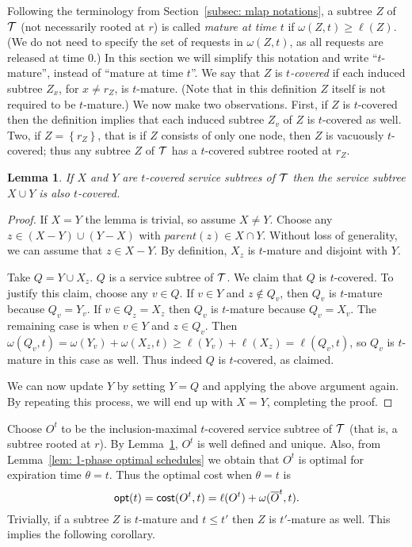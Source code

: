 \documentclass[a4paper]{article}
\newtheorem{lemma}[theorem]{Lemma}
\newcommand{\barO}{\overline{O}}
\newcommand{\calT}{{\cal T}}
\newcommand{\braced}[1]{{ \left\{ #1 \right\} }}
\newcommand{\cost}{\mbox{\rm\textsf{cost}}}
\newcommand{\opt}{\mbox{\rm\textsf{opt}}}
\newcommand{\length}{\ell}
\newcommand{\parent}{\textit{parent}}
\newcommand{\expiration}{\theta}
\begin{document}
Following the terminology from Section~\ref{subsec: mlap notations}, 
a subtree $Z$ of $\calT$ (not necessarily rooted at $r$)
is called \emph{mature at time $t$} if $\omega(Z,t)\ge \length(Z)$. (We do not need to specify
the set of requests in $\omega(Z,t)$, as all requests are released at time $0$.)
In this section we will simplify this notation and write ``$t$-mature'', instead of
``mature at time $t$''.
We say that $Z$ is \emph{$t$-covered} if each induced subtree 
$Z_x$, for $x\neq r_Z$, is $t$-mature. (Note that in this definition
$Z$ itself is not required to be $t$-mature.)
We now make two observations. First, if $Z$ is $t$-covered then
the definition implies that each induced subtree $Z_v$ of $Z$ is $t$-covered as well.
Two, if $Z = \braced{r_Z}$, that is if $Z$ consists of only one node,
then $Z$ is vacuously $t$-covered; thus any subtree $Z$
of $\calT$ has a $t$-covered subtree rooted at $r_Z$. 


\begin{lemma}\label{lem: Ot unique}
If $X$ and $Y$ are $t$-covered service subtrees of $\calT$ then
the service subtree $X\cup Y$ is also $t$-covered.
\end{lemma}

\begin{proof}
If $X=Y$ the lemma is trivial, so assume $X\neq Y$.
Choose any $z\in (X-Y)\cup (Y-X)$ with $\parent(z) \in X\cap Y$.
Without loss of generality, we can assume that $z\in X-Y$.
By definition, $X_z$ is $t$-mature and disjoint with $Y$. 

Take $Q = Y \cup X_z$. $Q$ is a service subtree of $\calT$. 
We claim that $Q$ is $t$-covered. To justify this claim, choose any $v\in Q$. 
If $v\in Y$ and $z\notin Q_v$, then $Q_v$ is $t$-mature because $Q_v = Y_v$.
If $v\in Q_z = X_z$ then $Q_v$ is $t$-mature because $Q_v = X_v$.
The remaining case is when $v\in Y$ and $z\in Q_v$.
Then
$\omega(Q_v,t) = \omega(Y_v)+\omega(X_z,t) \ge \length(Y_v) + \length(X_z) = \length(Q_v,t)$,
so $Q_v$ is $t$-mature in this case as well. 
Thus indeed $Q$ is $t$-covered, as claimed.

We can now update $Y$ by setting $Y = Q$ and applying the above argument again.
By repeating this process, we will end up with $X = Y$, completing the proof.
\end{proof}

Choose $O^t$ to be the inclusion-maximal $t$-covered service subtree of $\calT$ (that is, 
a subtree rooted at $r$). By Lemma~\ref{lem: Ot unique}, $O^t$ is well defined and unique.
Also, from Lemma~\ref{lem: 1-phase optimal schedules} we obtain that $O^t$ is optimal for 
expiration time $\expiration = t$. Thus the optimal cost when $\expiration = t$ is
\begin{equation*}
	\opt(t) = \cost(O^t,t) = \length(O^t) + \omega(\barO^t,t).
\end{equation*}
Trivially, if a subtree $Z$ is $t$-mature and $t\le t'$ then $Z$ is $t'$-mature as well.
This implies the following corollary.
\end{document}
